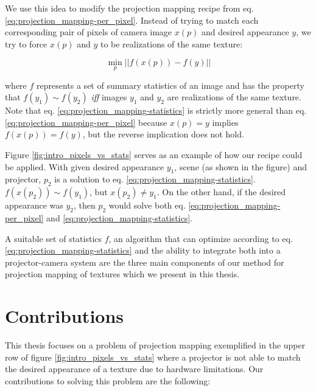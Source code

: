 We use this idea to modify the projection mapping recipe from eq. \ref{eq:projection_mapping-per_pixel}. Instead of trying to match each corresponding pair of pixels of camera image \(x(p)\) and desired appearance \(y\), we try to force \(x(p)\) and \(y\) to be realizations of the same texture:

\begin{equation}
    \label{eq:projection_mapping-statistics}
    \min_p || f(x(p)) - f(y) ||
\end{equation}

where \(f\) represents a set of summary statistics of an image and has the property that \(f(y_1) \sim f(y_2)\) \textit{iff} images \(y_1\) and \(y_2\) are realizations of the same texture. Note that eq. \ref{eq:projection_mapping-statistics} is strictly more general than eq. \ref{eq:projection_mapping-per_pixel} because \(x(p) = y\) implies \(f(x(p)) = f(y)\), but the reverse implication does not hold.

Figure \ref{fig:intro_pixels_vs_stats} serves as an example of how our recipe could be applied. With given desired appearance \(y_1\), scene (as shown in the figure) and projector, \(p_2\) is a solution to eq. \ref{eq:projection_mapping-statistics}. \(f(x(p_2)) \sim f(y_1)\), but \(x(p_2) \neq y_1\). On the other hand, if the desired appearance was \(y_2\), then \(p_2\) would solve both eq. \ref{eq:projection_mapping-per_pixel} and \ref{eq:projection_mapping-statistics}.

A suitable set of statistics \(f\), an algorithm that can optimize according to eq. \ref{eq:projection_mapping-statistics} and the ability to integrate both into a projector-camera system are the three main components of our method for projection mapping of textures which we present in this thesis.

\section{Contributions}
\label{section:intro-contributions}

This thesis focuses on a problem of projection mapping exemplified in the upper row of figure \ref{fig:intro_pixels_vs_stats} where a projector is not able to match the desired appearance of a texture due to hardware limitations. Our contributions to solving this problem are the following:

